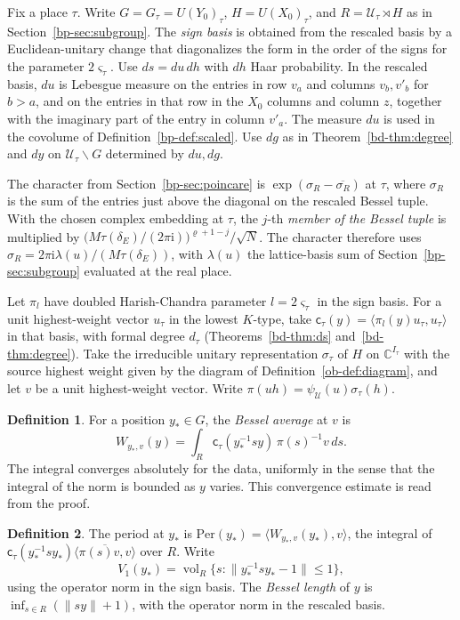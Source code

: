 \documentclass[reqno]{amsart}
\theoremstyle{definition}
\newtheorem{definition}{Definition}[section]
\theoremstyle{plain}
\theoremstyle{remark}
\newcommand{\C}{\mathbb C}
\newcommand{\ii}{\mathrm i}
\newcommand{\Uc}{\mathcal U}
\newcommand{\cf}{\mathsf c}
\newcommand{\Per}{\mathrm{Per}}
\newcommand{\vol}{\operatorname{vol}}
\begin{document}
Fix a place \(\tau\).  Write \(G=G_\tau=U(Y_0)_\tau\), \(H=U(X_0)_\tau\), and \(R=\Uc_\tau\rtimes H\) as in Section~\ref{bp-sec:subgroup}.  The \emph{sign basis} is obtained from the rescaled basis by a Euclidean-unitary change that diagonalizes the form in the order of the signs for the parameter \(2\varsigma_\tau\).  Use \(ds=du\,dh\) with \(dh\) Haar probability.  In the rescaled basis, \(du\) is Lebesgue measure on the entries in row \(v_a\) and columns \(v_b,v'_b\) for \(b>a\), and on the entries in that row in the \(X_0\) columns and column \(z\), together with the imaginary part of the entry in column \(v'_a\).  The measure \(du\) is used in the covolume of Definition~\ref{bp-def:scaled}.  Use \(dg\) as in Theorem~\ref{bd-thm:degree} and \(dy\) on \(\Uc_\tau\backslash G\) determined by \(du,dg\).

The character from Section~\ref{bp-sec:poincare} is \(\exp(\sigma_R-\overline{\sigma_R})\) at \(\tau\), where \(\sigma_R\) is the sum of the entries just above the diagonal on the rescaled Bessel tuple.  With the chosen complex embedding at \(\tau\), the \(j\)-th \emph{member of the Bessel tuple} is multiplied by \(\bigl(M\tau(\delta_E)/(2\pi\ii)\bigr)^{\varrho+1-j}/\sqrt N\).  The character therefore uses \(\sigma_R=2\pi\ii\lambda(u)/(M\tau(\delta_E))\), with \(\lambda(u)\) the lattice-basis sum of Section~\ref{bp-sec:subgroup} evaluated at the real place.

Let \(\pi_l\) have doubled Harish-Chandra parameter \(l=2\varsigma_\tau\) in the sign basis.  For a unit highest-weight vector \(u_\tau\) in the lowest \(K\)-type, take \(\cf_\tau(y)=\langle\pi_l(y)u_\tau,u_\tau\rangle\) in that basis, with formal degree \(d_\tau\) (Theorems~\ref{bd-thm:ds} and~\ref{bd-thm:degree}).  Take the irreducible unitary representation \(\sigma_\tau\) of \(H\) on \(\C^{I_\tau}\) with the source highest weight given by the diagram of Definition~\ref{ob-def:diagram}, and let \(v\) be a unit highest-weight vector.  Write \(\pi(uh)=\psi_{\Uc}(u)\sigma_\tau(h)\).

\begin{definition}\label{def:average}
For a position \(y_*\in G\), the \emph{Bessel average} at \(v\) is
\[
 W_{y_*,v}(y)=\int_R\cf_\tau(y_*^{-1}sy)\,\pi(s)^{-1}v\,ds .
\]
The integral converges absolutely for the data, uniformly in the sense that the integral of the norm is bounded as \(y\) varies.  This convergence estimate is read from the proof.
\end{definition}

\begin{definition}\label{def:period}
The period at \(y_*\) is \(\Per(y_*)=\langle W_{y_*,v}(y_*),v\rangle\), the integral of \(\cf_\tau(y_*^{-1}sy_*)\overline{\langle\pi(s)v,v\rangle}\) over \(R\).  Write
\[
 V_1(y_*)=\vol_R\{s:\|y_*^{-1}sy_*-1\|\le1\},
\]
using the operator norm in the sign basis.  The \emph{Bessel length} of \(y\) is \(\inf_{s\in R}(\|sy\|+1)\), with the operator norm in the rescaled basis.
\end{definition}
\end{document}
